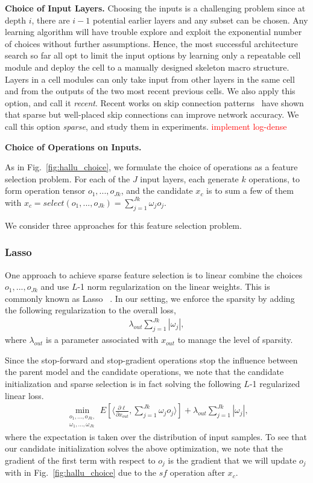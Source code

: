 \documentclass{article}
\newcommand{\todo}[1]{\textcolor{red}{#1}}
\begin{document}
\textbf{Choice of Input Layers.} 
Choosing the inputs is a challenging problem since at depth $i$, there are $i-1$ potential earlier layers and any subset can be chosen. Any learning algorithm will have trouble explore and exploit the exponential number of choices without further assumptions. Hence, the most successful architecture search so far all opt to limit the input options by learning only a repeatable cell module and deploy the cell to a manually designed skeleton macro structure. Layers in a cell modules can only take input from other layers in the same cell and from the outputs of the two most recent previous cells. We also apply this option, and call it \textit{recent}. 
Recent works on skip connection patterns~\citep{logdense, sparsenet} have shown that sparse but well-placed skip connections can improve network accuracy. We call this option \textit{sparse}, and study them in experiments. \todo{implement log-dense}

\textbf{Choice of Operations on Inputs.}

As in Fig.~\ref{fig:hallu_choice}, we formulate the choice of operations as a feature selection problem. For each of the $J$ input layers, each generate $k$ operations, to form
operation tensor $o_1,...,o_{Jk}$, and the candidate $x_c$ is to sum a few of them with $x_c = select(o_1,..., o_{Jk}) = \sum _{j = 1}^{Jk} \omega_j o_j$. 

We consider three approaches for this feature selection problem.

\subsubsection{Lasso} 
One approach to achieve sparse feature selection is to linear combine the choices $o_1,...,o_{Jk}$ and use $L$-1 norm regularization on the linear weights. This is commonly known as Lasso
~\citep{lasso}. In our setting, we enforce the sparsity by adding the following regularization to the overall loss,
\begin{align}
    \lambda_{out} \sum _{j = 1}^{Jk} | \omega_j |,
\end{align}
where $\lambda_{out}$ is a parameter associated with $x_{out}$ to manage the level of sparsity. 

Since the stop-forward and stop-gradient operations stop the influence between the parent model and the candidate operations, we note that the candidate initialization and sparse selection is in fact solving the following $L$-1 regularized linear loss. 
\begin{align}
\label{eq:linear_lasso}
\min _{
    \substack{o_1,...,o_{Jk}, \\ \omega_1,..., \omega_{Jk}}
    } 
    E [\langle 
        \frac{\partial \ell}{\partial x_{out}} , 
        \sum _{j = 1}^{Jk} \omega_j o_j
    \rangle ] 
    + \lambda_{out} \sum _{j = 1}^{Jk} | \omega_j |,
\end{align}
where the expectation is taken over the distribution of input samples. 
To see that our candidate initialization solves the above optimization, we note that the gradient of the first term with respect to $o_j$ is the gradient that we will update $o_j$ with in Fig.~\ref{fig:hallu_choice} due to the $sf$ operation after $x_c$. 
\end{document}
